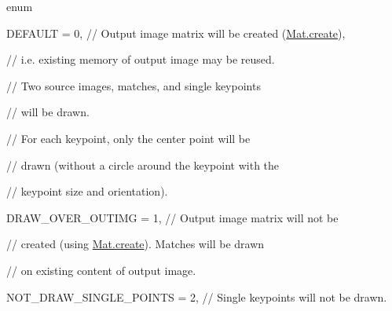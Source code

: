 {\ttfamily enum}

{\ttfamily }

{\ttfamily }

{\ttfamily D\+E\+F\+A\+U\+LT = 0, // Output image matrix will be created (\mbox{\hyperlink{classorg_1_1opencv_1_1core_1_1_mat_a539b0a3690afb6b43047b50cbb787fee}{Mat.\+create}}),}

{\ttfamily }

{\ttfamily }

{\ttfamily // i.\+e. existing memory of output image may be reused.}

{\ttfamily }

{\ttfamily }

{\ttfamily // Two source images, matches, and single keypoints}

{\ttfamily }

{\ttfamily }

{\ttfamily // will be drawn.}

{\ttfamily }

{\ttfamily }

{\ttfamily // For each keypoint, only the center point will be}

{\ttfamily }

{\ttfamily }

{\ttfamily // drawn (without a circle around the keypoint with the}

{\ttfamily }

{\ttfamily }

{\ttfamily // keypoint size and orientation).}

{\ttfamily }

{\ttfamily }

{\ttfamily D\+R\+A\+W\+\_\+\+O\+V\+E\+R\+\_\+\+O\+U\+T\+I\+MG = 1, // Output image matrix will not be}

{\ttfamily }

{\ttfamily }

{\ttfamily // created (using \mbox{\hyperlink{classorg_1_1opencv_1_1core_1_1_mat_a539b0a3690afb6b43047b50cbb787fee}{Mat.\+create}}). Matches will be drawn}

{\ttfamily }

{\ttfamily }

{\ttfamily // on existing content of output image.}

{\ttfamily }

{\ttfamily }

{\ttfamily N\+O\+T\+\_\+\+D\+R\+A\+W\+\_\+\+S\+I\+N\+G\+L\+E\+\_\+\+P\+O\+I\+N\+TS = 2, // Single keypoints will not be drawn.}

